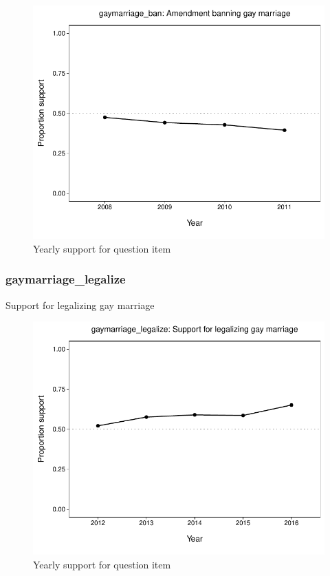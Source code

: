 \documentclass[
  12pt]{article}
\begin{document}
\begin{figure}

{\centering \includegraphics{error-checking_files/figure-latex/unnamed-chunk-3-38} 

}

\caption{Yearly support for question item}\label{fig:unnamed-chunk-3-38}
\end{figure}

\hypertarget{gaymarriage_legalize}{%
\subsubsection{gaymarriage\_legalize}\label{gaymarriage_legalize}}

Support for legalizing gay marriage

\begin{figure}

{\centering \includegraphics{error-checking_files/figure-latex/unnamed-chunk-3-39} 

}

\caption{Yearly support for question item}\label{fig:unnamed-chunk-3-39}
\end{figure}
\end{document}
